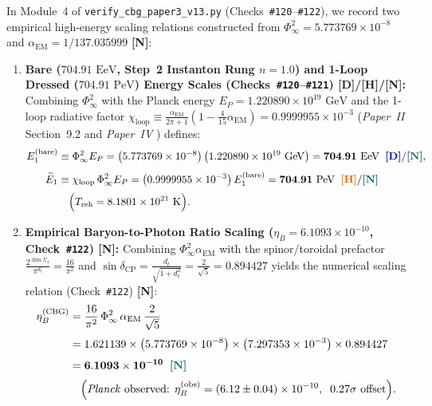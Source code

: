 \documentclass[11pt,a4paper]{article}
\newcommand{\catD}{\textbf{\textcolor{blue!75!black}{[D]}}}
\newcommand{\catH}{\textbf{\textcolor{orange!85!black}{[H]}}}
\newcommand{\catN}{\textbf{\textcolor{teal!75!black}{[N]}}}
\theoremstyle{plain}
\theoremstyle{definition}
\theoremstyle{remark}
\numberwithin{equation}{section}
\begin{document}
In Module~4 of \allowbreak\texttt{verify\_cbg\_paper3\_v13.py} (Checks~\texttt{\#120}--\texttt{\#122}), we record two empirical high-energy scaling relations constructed from $\Phi_{\infty}^2 = 5.773769 \times 10^{-8}$ and $\alpha_{\text{EM}} = 1/137.035999$ \catN:
\begin{enumerate}
  \item \textbf{Bare ($704.91\text{ EeV}$, Step~2 Instanton Rung $n = 1.0$) and 1-Loop Dressed ($704.91\text{ PeV}$) Energy Scales (Checks~\texttt{\#120}--\texttt{\#121}) \catD/\catH/\catN:} Combining $\Phi_{\infty}^2$ with the Planck energy $E_P = 1.220890 \times 10^{19}\text{ GeV}$ and the 1-loop radiative factor $\chi_{\text{loop}} \equiv \frac{\alpha_{\text{EM}}}{2\pi + 1}\left(1 - \frac{4}{15}\alpha_{\text{EM}}\right) = 0.9999955 \times 10^{-3}$ (\textit{Paper~II} Section~9.2 \cite{jimenez2026b} and \textit{Paper~IV} \cite{JV_PaperIV}) defines:
  \begin{align}
  E_1^{\text{(bare)}} &\equiv \Phi_{\infty}^2 E_P = \left(5.773769 \times 10^{-8}\right)\left(1.220890 \times 10^{19}\text{ GeV}\right) = \mathbf{704.91\text{ EeV}} \;\;\catD/\catN, \nonumber \\[4pt]
  \widetilde{E}_1 &\equiv \chi_{\text{loop}}\,\Phi_{\infty}^2 E_P = \left(0.9999955 \times 10^{-3}\right) E_1^{\text{(bare)}} = \mathbf{704.91\text{ PeV}} \;\;\catH/\catN \nonumber \\[2pt]
  &\quad \Bigl(T_{\text{reh}} = 8.1801 \times 10^{21}\text{ K}\Bigr).
  \label{eq:cosmo_703_pev_reheating}
  \end{align}
  \item \textbf{Empirical Baryon-to-Photon Ratio Scaling ($\eta_B = 6.1093 \times 10^{-10}$, Check~\texttt{\#122}) \catN:} Combining $\Phi_{\infty}^2\alpha_{\text{EM}}$ with the spinor/toroidal prefactor $\frac{2^{\dim\Sigma_4}}{\pi^{d_t}} = \frac{16}{\pi^2}$ and $\sin\delta_{\text{CP}} = \frac{d_t}{\sqrt{1+d_t^2}} = \frac{2}{\sqrt{5}} = 0.894427$ \cite{sakharov1967_baryon} yields the numerical scaling relation (Check~\texttt{\#122}) \catN:
  \begin{align}
  \eta_B^{\text{(CBG)}} &= \frac{16}{\pi^2}\,\Phi_{\infty}^2\,\alpha_{\text{EM}}\,\frac{2}{\sqrt{5}} \nonumber \\[3pt]
  &= 1.621139 \times \left(5.773769 \times 10^{-8}\right) \times \left(7.297353 \times 10^{-3}\right) \times 0.894427 \nonumber \\[3pt]
  &= \mathbf{6.1093 \times 10^{-10}} \;\;\catN \nonumber \\[2pt]
  &\quad \Bigl(\text{\textit{Planck} observed: } \eta_B^{\text{(obs)}} = (6.12 \pm 0.04) \times 10^{-10}, \;\; 0.27\sigma\text{ offset}\Bigr).
  \label{eq:baryon_asymmetry_eta}
  \end{align}
\end{enumerate}
\end{document}
